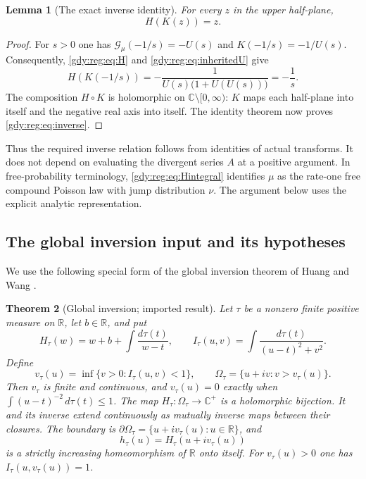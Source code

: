 \documentclass[11pt]{article}
\numberwithin{equation}{section}
\newtheorem{theorem}{Theorem}[section]
\newtheorem{lemma}[theorem]{Lemma}
\theoremstyle{definition}
\theoremstyle{remark}
\begin{document}
\begin{lemma}[The exact inverse identity]\label{gdy:reg:lem:inverse}
For every $z$ in the upper half-plane,
\begin{equation}\label{gdy:reg:eq:inverse}
 H(K(z))=z.
\end{equation}
\end{lemma}
\begin{proof}
For $s>0$ one has
$\mathcal G_\mu(-1/s)=-U(s)$ and $K(-1/s)=-1/U(s)$.
Consequently, \eqref{gdy:reg:eq:H} and \eqref{gdy:reg:eq:inheritedU} give
\[
 H(K(-1/s))
 =-\frac1{U(s)\bigl(1+U(U(s))\bigr)}
 =-\frac1s.
\]
The composition $H\circ K$ is holomorphic on
$\mathbb C\setminus[0,\infty)$: $K$ maps each half-plane into itself
and the negative real axis into itself.  The identity theorem now proves
\eqref{gdy:reg:eq:inverse}.
\end{proof}

Thus the required inverse relation follows from identities of actual
transforms.  It does not depend on evaluating the divergent series $A$
at a positive argument.  In free-probability terminology,
\eqref{gdy:reg:eq:Hintegral} identifies $\mu$ as the rate-one free compound
Poisson law with jump distribution $\nu$.  The argument below uses the
explicit analytic representation.

\subsection{The global inversion input and its hypotheses}
\label{gdy:reg:subsec:global}

We use the following special form of the global inversion theorem of
Huang and Wang \cite[Propositions 3.1--3.2]{huangwang}.

\begin{theorem}[Global inversion; imported result]
\label{gdy:reg:thm:imported}
Let $\tau$ be a nonzero finite positive measure on $\mathbb R$, let
$b\in\mathbb R$, and put
\[
 H_\tau(w)=w+b+\int\frac{d\tau(t)}{w-t},\qquad
 I_\tau(u,v)=\int\frac{d\tau(t)}{(u-t)^2+v^2}.
\]
Define
\[
 v_\tau(u)=\inf\{v>0:I_\tau(u,v)<1\},\qquad
 \Omega_\tau=\{u+iv:v>v_\tau(u)\}.
\]
Then $v_\tau$ is finite and continuous, and
$v_\tau(u)=0$ exactly when
$\int (u-t)^{-2}\,d\tau(t)\le1$.
The map $H_\tau:\Omega_\tau\to\mathbb C^+$ is a holomorphic bijection.
It and its inverse extend continuously as mutually inverse maps between
their closures.  The boundary is
$\partial\Omega_\tau=\{u+iv_\tau(u):u\in\mathbb R\}$, and
\[
 h_\tau(u)=H_\tau(u+iv_\tau(u))
\]
is a strictly increasing homeomorphism of $\mathbb R$ onto itself.
For $v_\tau(u)>0$ one has
$I_\tau(u,v_\tau(u))=1$.
\end{theorem}
\end{document}
